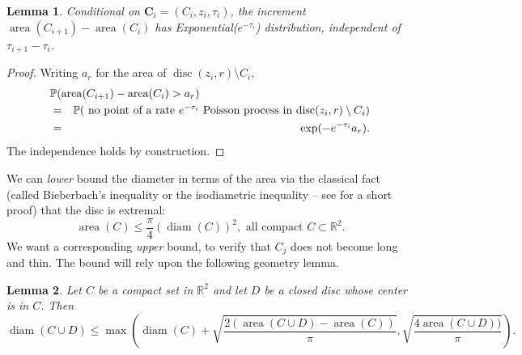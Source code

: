 \documentclass[12pt]{article}
\newtheorem{Lemma}{Lemma}
\newcommand{\sfrac}[2]{{\textstyle\frac{#1}{#2}}}
\newcommand{\Reals}{{\mathbb{R}}}
\newcommand{\bC}{{\mathbf C}}
\renewcommand{\Pr}{{\mathbb P}}
\DeclareMathOperator{\diam}{diam}
\DeclareMathOperator{\area}{area}
\DeclareMathOperator{\disc}{disc}
\begin{document}
\begin{Lemma}
\label{LA1}
Conditional on $\bC_i = (C_i,z_i,\tau_i)$, the increment
$\area(C_{i+1}) - \area(C_i)$ has Exponential($e^{-\tau_i}$) distribution, independent of $\tau_{i+1} - \tau_i$.
\end{Lemma}
\begin{proof}
Writing $a_r$ for the area of 
$\disc(z_i,r) \setminus C_i$, 
\begin{eqnarray*}
\lefteqn{
\Pr (\area(C_{i+1}) - \area(C_i) > a_r  )
}
\\
&=&
\Pr(\mbox{ no point of a rate $e^{-\tau_i}$ Poisson process in 
$\disc(z_i,r) \setminus C_i$} )\\
&=& \exp(-  e^{-\tau_i} a_r) .
\end{eqnarray*}
The independence holds by construction.
\end{proof}


We can {\em lower} bound the diameter in terms of the area via
 the classical 
fact (called Bieberbach's inequality or the isodiametric inequality -- 
see \cite{MR872858} for a short proof) that the disc is extremal: 
\begin{equation}
\area(C) \le \sfrac{\pi}{4} (\diam(C))^2, \mbox{ all compact } C \subset \Reals^2 .
\label{iso}
\end{equation}
We want a corresponding {\em upper} bound, to verify that $C_j$ does not
become long and thin.  
The bound will rely upon the following geometry lemma.


\begin{Lemma}
\label{LC1}
Let $C$ be a compact set in $\Reals^2$ and let $D$ be a closed disc 
whose center is in $C$.  Then
\[
\diam(C \cup D) \le  \max \left(  \diam(C)  +
\sqrt{\sfrac{2 (\area(C \cup D) - \area(C))}{\pi}} , 
\sqrt{
 \sfrac{4 \area (C \cup D) )}{\pi} } \right) .\]
\end{Lemma}
\end{document}
